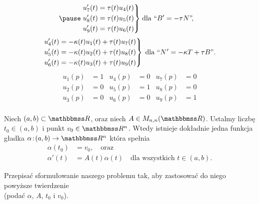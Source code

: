 \begin{frame}[<+->]
\begin{align*}
\pause\left.\begin{aligned}      
u_7'(t)&=\tau(t)u_4(t)\\
u_8'(t)&=\tau(t)u_5(t)\\
u_9'(t)&=\tau(t)u_6(t)
\end{aligned}\right\}&\;\text{dla }``B'=-\tau N\text{''}\!,
\end{align*}
\vspace*{-0.1in}
\pause\begin{equation*}
\left.\begin{aligned}      
u_4'(t)&=-\kappa(t)u_1(t)+\tau(t)u_7(t)\\
u_5'(t)&=-\kappa(t)u_2(t)+\tau(t)u_8(t)\\
u_6'(t)&=-\kappa(t)u_3(t)+\tau(t)u_9(t)
\end{aligned}\right\}\;\text{dla }``N\hspace{0.5pt}'=-\kappa T+\tau B\text{''}.
\end{equation*}
\vspace*{-0.2in}
\pause \begin{align*}
u_1(p)&=1 & u_4(p)&=0 & u_7(p)&=0\\ 
u_2(p)&=0 & u_5(p)&=1 & u_8(p)&=0\\
u_3(p)&=0 & u_6(p)&=0 & u_9(p)&=1\\ 
 \end{align*}

\end{frame}
\begin{frame}[<+->]
\begin{twierdzenie}\label{thm:dif-eq-solution}
Niech $(a,b)\subset \R$, oraz  niech $A\in M_{n,n}(\R)$.  Ustalmy liczbę $t_0\in (a,b)$ i punkt $v_0\in \R^n$. Wtedy istnieje dokładnie jedna funkcja gładka $\alpha\colon (a,b)\to \R^n$ która spełnia 
\begin{align*}
\alpha(t_0)&=v_0,\quad\text{oraz}\\
\alpha'(t)&=A(t)\alpha(t) \quad\text{dla wszystkich }t\in (a,b).
\end{align*}
\end{twierdzenie}

\begin{exercise}
Przepisać sformułowanie naszego problemu tak, aby zastosować do niego powyższe twierdzenie \\(podać $\alpha$, $A$, $t_0$ i $v_0$). 
\end{exercise}

\end{frame}
